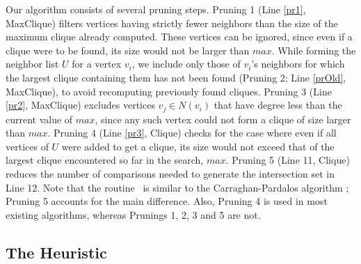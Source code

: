 Our algorithm consists of several pruning steps.
Pruning 1 (Line \ref{pr1}, {\sc MaxClique}) 
filters vertices having strictly fewer neighbors than the size of the maximum clique already computed. These vertices can be ignored, since even if a clique were to be found, its size would not be larger than $max$.
While forming the neighbor list $U$ for a vertex $v_i$, we include only those of $v_i$'s 
neighbors for which the largest clique containing them has not been found 
(Pruning 2; Line \ref{prOld}, {\sc MaxClique}), 
to avoid recomputing previously found cliques.  
Pruning 3 (Line \ref{pr2}, {\sc MaxClique})
excludes vertices $v_j \in N(v_i)$  that have degree less than the current value of $max$, since any such vertex could not form a clique of size larger than $max$.
Pruning 4 (Line \ref{pr3}, {\sc Clique})
checks for the case where even if all vertices of $U$ were added to get a clique, its size would not exceed that of the largest clique encountered so far in the search, $max$. 
Pruning 5 (Line 11, {\sc Clique})
reduces the number of comparisons needed to generate the intersection set in Line 12.
Note that the routine \clq\ is similar to the 
Carraghan-Pardalos algorithm \cite{pardalos}; Pruning 5 accounts for the main difference.
Also, Pruning 4 is used in most existing algorithms, whereas Prunings 1, 2, 3 and 5 are not.

\subsection{The Heuristic}
\label{subsec:heuristic}


